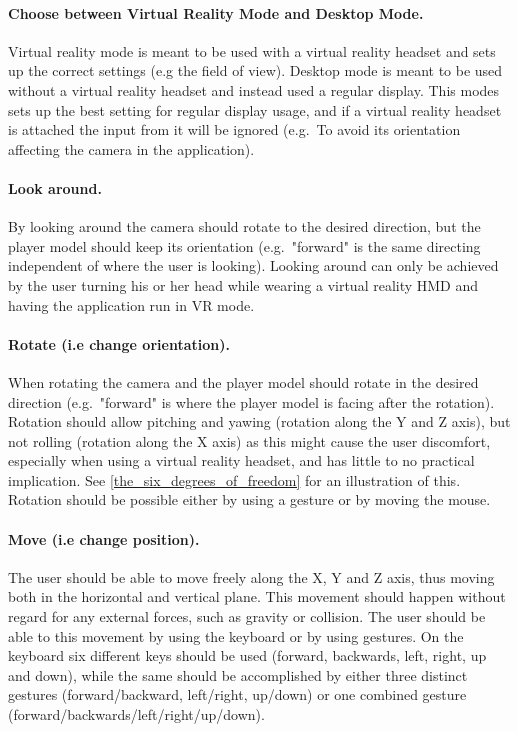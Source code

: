 \paragraph{Choose between Virtual Reality Mode and Desktop Mode.} Virtual reality mode is meant to be used with a virtual reality headset
and sets up the correct settings (e.g the field of view). Desktop mode is meant to be used without a virtual reality headset and instead used
a regular display. This modes sets up the best setting for regular display usage, and if a virtual reality headset is attached the input from it will be ignored 
(e.g.~To avoid its orientation affecting the camera in the application).

\paragraph{Look around.} By looking around the camera should rotate to the desired direction, but the player model should keep its orientation 
(e.g.~"forward" is the same directing independent of where the user is looking). Looking around can only be achieved by the user turning his or her 
head while wearing a virtual reality HMD and having the application run in VR mode.

\paragraph{Rotate (i.e change orientation).} When rotating the camera and the player model should rotate in the desired direction (e.g.~"forward" is where the player model is
facing after the rotation).
Rotation should allow pitching and yawing (rotation along the Y and Z axis), but not rolling (rotation along the X axis) as this might cause the user discomfort, especially when
using a virtual reality headset, and has little to no practical implication. See \ref{the_six_degrees_of_freedom} for an illustration of this. 
Rotation should be possible either by using a gesture or by moving the mouse.

\paragraph{Move (i.e change position).} The user should be able to move freely along the X, Y and Z axis, thus moving both in the horizontal and vertical plane. 
This movement should happen without regard for any external forces, such as gravity or collision. The user should be able to this movement by using the keyboard or 
by using gestures. On the keyboard six different keys should be used (forward, backwards, left, right, up and down), while the same should be accomplished by
either three distinct gestures (forward/backward, left/right, up/down) or one combined gesture (forward/backwards/left/right/up/down).

